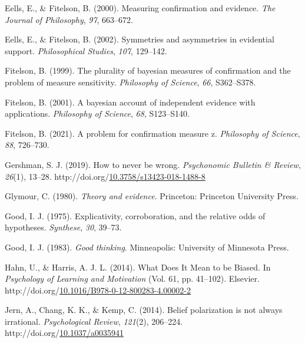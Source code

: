 \documentclass[10pt, letterpaper]{article}
\newenvironment{CSLReferences}%
  {}%
  {\par}
\begin{document}
\begin{CSLReferences}
\leavevmode{}%
Eells, E., \& Fitelson, B. (2000). Measuring confirmation and evidence.
\emph{The Journal of Philosophy}, \emph{97}, 663--672.

\leavevmode{}%
Eells, E., \& Fitelson, B. (2002). Symmetries and asymmetries in
evidential support. \emph{Philosophical Studies}, \emph{107}, 129--142.

\leavevmode{}%
Fitelson, B. (1999). The plurality of bayesian measures of confirmation
and the problem of measure sensitivity. \emph{Philosophy of Science},
\emph{66}, S362--S378.

\leavevmode{}%
Fitelson, B. (2001). A bayesian account of independent evidence with
applications. \emph{Philosophy of Science}, \emph{68}, S123--S140.

\leavevmode{}%
Fitelson, B. (2021). A problem for confirmation measure z.
\emph{Philosophy of Science}, \emph{88}, 726--730.

\leavevmode{}%
Gershman, S. J. (2019). How to never be wrong. \emph{Psychonomic
Bulletin \& Review}, \emph{26}(1), 13--28.
http://doi.org/\href{https://doi.org/10.3758/s13423-018-1488-8}{10.3758/s13423-018-1488-8}

\leavevmode{}%
Glymour, C. (1980). \emph{Theory and evidence}. Princeton: Princeton
University Press.

\leavevmode{}%
Good, I. J. (1975). Explicativity, corroboration, and the relative odds
of hypotheses. \emph{Synthese}, \emph{30}, 39--73.

\leavevmode{}%
Good, I. J. (1983). \emph{Good thinking}. Minneapolis: University of
Minnesota Press.

\leavevmode{}%
Hahn, U., \& Harris, A. J. L. (2014). What {Does} {It} {Mean} to be
{Biased}. In \emph{Psychology of {Learning} and {Motivation}} (Vol. 61,
pp. 41--102). Elsevier.
http://doi.org/\href{https://doi.org/10.1016/B978-0-12-800283-4.00002-2}{10.1016/B978-0-12-800283-4.00002-2}

\leavevmode{}%
Jern, A., Chang, K. K., \& Kemp, C. (2014). Belief polarization is not
always irrational. \emph{Psychological Review}, \emph{121}(2), 206--224.
http://doi.org/\href{https://doi.org/10.1037/a0035941}{10.1037/a0035941}


\end{CSLReferences}
\end{document}
